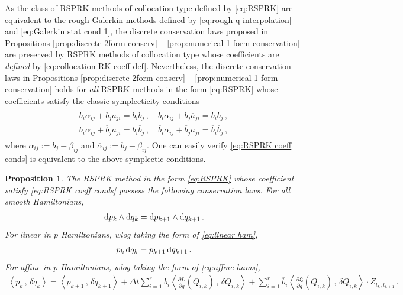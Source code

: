 \documentclass[11pt, oneside]{article}
\numberwithin{equation}{section}
\newtheorem{proposition}[lemma]{Proposition}
\theoremstyle{definition}
\newcommand{\ob}[1]{\overline{#1}}
\newcommand{\scp}[2]{{\left\langle {#1}\, , \, {#2}\right\rangle}}
\def\p{{\partial}}
\def\rmd{{\rm d}}
\def\p{\partial}
\begin{document}
As the class of RSPRK methods of collocation type defined by \eqref{eq:RSPRK} are equivalent to the rough Galerkin methods defined by \eqref{eq:rough q interpolation} and \eqref{eq:Galerkin stat cond 1}, the discrete conservation laws proposed in Propositions \eqref{prop:discrete 2form conserv} -- \eqref{prop:numerical 1-form conservation} are preserved by RSPRK methods of collocation type whose coefficients are \emph{defined} by \eqref{eq:collocation RK coeff def}. Nevertheless, the discrete conservation laws in Propositions \eqref{prop:discrete 2form conserv} -- \eqref{prop:numerical 1-form conservation} holds for \emph{all} RSPRK methods in the form \eqref{eq:RSPRK} whose coefficients satisfy the classic symplecticity conditions 
\begin{align}
\begin{split}\label{eq:sym cond 2}
    b_i\alpha_{ij} + b_ja_{ji} = b_ib_j\,,\quad 
    \ob{b}_i\alpha_{ij} + b_j\ob{a}_{ji} = \ob{b}_ib_j\,,\\
    b_i\ob{\alpha}_{ij} + \ob{b}_ja_{ji} = b_i\ob{b}_j\,,\quad 
    \ob{b}_i\ob{\alpha}_{ij} + \ob{b}_j\ob{a}_{ji} = \ob{b}_i\ob{b}_j\,,
\end{split}
\end{align}
where $\alpha_{ij} := b_j - \beta_{ij}$ and $\ob{\alpha}_{ij} := \ob{b}_j - \ob{\beta}_{ij}$. One can easily verify \eqref{eq:RSPRK coeff conds} is equivalent to the above symplectic conditions. 
\begin{proposition}\label{Prop:RSPRK conservation laws}
    The RSPRK method in the form \eqref{eq:RSPRK} whose coefficient satisfy \eqref{eq:RSPRK coeff conds} possess the following conservation laws. For all smooth Hamiltonians, 
    \begin{align}
        \rmd p_k \wedge \rmd q_k = \rmd p_{k+1} \wedge \rmd q_{k+1}\,.
    \end{align}
     For linear in $p$ Hamiltonians, wlog taking the form of \eqref{eq:linear ham},
    \begin{align}
        p_k \,\rmd q_k = p_{k+1}\, \rmd q_{k+1}\,. 
    \end{align}
     For affine in $p$ Hamiltonians, wlog taking the form of \eqref{eq:affine hams},
     \begin{align}
        \scp{p_k}{\delta q_k} = \scp{p_{k+1}}{\delta q_{k+1}} + \Delta t\sum_{i=1}^r b_i \scp{\frac{\p L}{\p q}(Q_{i,k})}{\delta Q_{i,k}} + \sum_{i=1}^r \ob{b}_i\scp{\frac{\p \mathfrak{L}}{\p q}(Q_{i,k})}{\delta Q_{i,k}}\cdot Z_{t_k, t_{k+1}}\,.
    \end{align}
\end{proposition}
\end{document}
